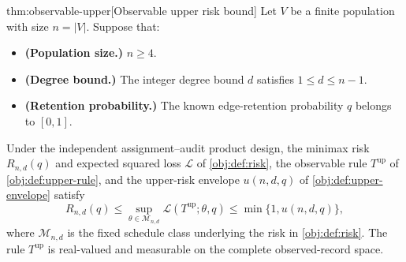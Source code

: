 \begin{theoremv}{thm:observable-upper}[Observable upper risk bound]
Let \(V\) be a finite population with size \(n=|V|\). Suppose that:
\begin{itemize}
\item \textbf{(Population size.)} \(n\ge4\).
\item \textbf{(Degree bound.)} The integer degree bound \(d\) satisfies \(1\le d\le n-1\).
\item \textbf{(Retention probability.)} The known edge-retention probability \(q\) belongs to \([0,1]\).
\end{itemize}
Under the independent assignment--audit product design, the minimax risk \(R_{n,d}(q)\) and expected squared loss \(\mathcal L\) of \cref{obj:def:risk}, the observable rule \(T^{\mathrm{up}}\) of \cref{obj:def:upper-rule}, and the upper-risk envelope \(u(n,d,q)\) of \cref{obj:def:upper-envelope} satisfy
\[
R_{n,d}(q)
\le
\sup_{\theta\in\mathcal M_{n,d}}
\mathcal L(T^{\mathrm{up}};\theta,q)
\le
\min\{1,u(n,d,q)\},
\]
where \(\mathcal M_{n,d}\) is the fixed schedule class underlying the risk in \cref{obj:def:risk}. The rule \(T^{\mathrm{up}}\) is real-valued and measurable on the complete observed-record space.
\end{theoremv}

